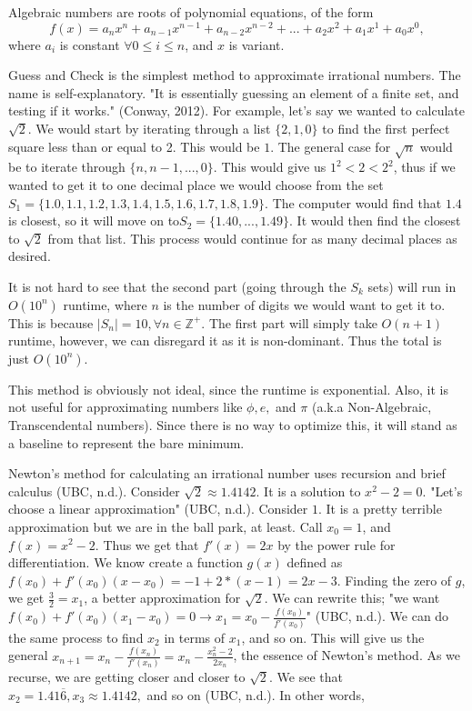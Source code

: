 \documentclass{article}
\begin{document}
\par Algebraic numbers are roots of polynomial equations, of the form 
$$f(x)=a_nx^n+a_{n-1}x^{n-1}+a_{n-2}x^{n-2}+...+a_2x^2+a_1x^1+a_0x^0,$$
where $a_i$ is constant $\forall  0\le i\le n$, and $x$ is variant. 
\par Guess and Check is the simplest method to approximate irrational numbers. The name is self-explanatory. "It is essentially guessing an element of a finite set, and testing if it works." (Conway, 2012). For example, let's say we wanted to calculate $\sqrt{2}$. We would start by iterating through a list $\{2,1,0\}$ to find the first perfect square less than or equal to 2. This would be $1$. The general case for $\sqrt{n}$ would be to iterate through $\{n,n-1,...,0\}$. This would give us $1^2<2<2^2$, thus if we wanted to get it to one decimal place we would choose from the set $S_1=\{1.0,1.1,1.2,1.3,1.4,1.5,1.6,1.7,1.8,1.9\}$. The computer would find that $1.4$ is closest, so it will move on to\newline  $S_2=\{1.40,...,1.49\}$. It would then find the closest to $\sqrt{2}$ from that list. This process would continue for as many decimal places as desired.
\par It is not hard to see that the second part (going through the $S_k$ sets) will run in $O(10^n)$ runtime, where $n$ is the number of digits we would want to get it to. This is because $|S_n|=10, \forall n\in\mathbb{Z}^+$. The first part will simply take $O(n+1)$ runtime, however, we can disregard it as it is non-dominant. Thus the total is just $O(10^n)$. 
\par This method is obviously not ideal, since the runtime is exponential. Also, it is not useful for approximating numbers like $\phi,e,$ and $\pi$ (a.k.a Non-Algebraic, Transcendental numbers). Since there is no way to optimize this, it will stand as a baseline to represent the bare minimum.
\par Newton's method for calculating an irrational number uses recursion and brief calculus (UBC, n.d.). Consider $\sqrt{2}\approx 1.4142$. It is a solution to $x^2-2=0$. "Let's choose a linear approximation" (UBC, n.d.). Consider $1$. It is a pretty terrible approximation but we are in the ball park, at least. Call $x_0=1$, and $f(x)=x^2-2$. Thus we get that $f'(x)=2x$ by the power rule for differentiation. We know create a function $g(x)$ defined as $f(x_0)+f'(x_0)(x-x_0)=-1+2*(x-1)=2x-3$. Finding the zero of $g$, we get $\frac32=x_1$, a better approximation for $\sqrt2$. We can rewrite this; "we want $f(x_0)+f'(x_0)(x_1-x_0)=0\rightarrow x_1=x_0-\frac{f(x_0)}{f'(x_0)}$" (UBC, n.d.). We can do the same process to find $x_2$ in terms of $x_1$, and so on. This will give us the general $x_{n+1}=x_n-\frac{f(x_n)}{f'(x_n)}=x_n-\frac{x_n^2-2}{2x_n}$, the essence of Newton's method. As we recurse, we are getting closer and closer to $\sqrt{2}$. We see that $x_2=1.41\overline{6}, x_3\approx 1.4142,$ and so on (UBC, n.d.). In other words, 
\end{document}
